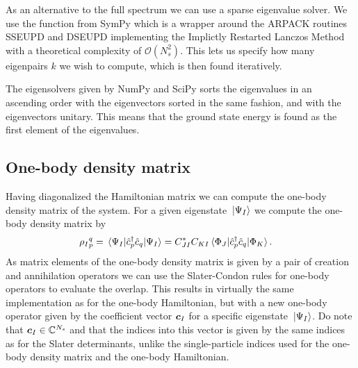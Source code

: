             As an alternative to the full spectrum we can use a sparse
            eigenvalue solver.
            We use the function  from SymPy
            \cite{sympy} which is a wrapper around the ARPACK routines SSEUPD
            and DSEUPD \cite{arpack} implementing the Implictly Restarted
            Lanczos Method with a theoretical complexity of $\mathcal{O}(N_s^2)$.
            This lets us specify how many eigenpairs $k$ we wish to compute,
            which is then found iteratively.

            The eigensolvers given by NumPy \cite{numpy} and SciPy \cite{sympy}
            sorts the eigenvalues in an ascending order with the eigenvectors
            sorted in the same fashion, and with the eigenvectors unitary.
            This means that the ground state energy is found as the first
            element of the eigenvalues.

        \subsection{One-body density matrix}
            Having diagonalized the Hamiltonian matrix we can compute the one-body
            density matrix of the system.
            For a given eigenstate $\ket*{\Psi_I}$ we compute the one-body
            density matrix by
            \begin{align}
                {\rho_I}^{q}_{p}
                &= \mel*{\Psi_I}{\hat{c}_{p}^{\dagger}\hat{c}_{q}}{\Psi_I}
                = C_{JI}^{*}C_{KI}
                \mel*{\Phi_J}{\hat{c}_{p}^{\dagger}\hat{c}_{q}}{\Phi_K}.
                \label{eq:ci-one-body-density}
            \end{align}
            As matrix elements of the one-body density matrix is given by a pair
            of creation and annihilation operators we can use the Slater-Condon
            rules for one-body operators to evaluate the overlap.
            This results in virtually the same implementation as for the
            one-body Hamiltonian, but with a new one-body operator given by the
            coefficient vector $\boldsymbol{c}_I$ for a specific eigenstate
            $\ket*{\Psi_I}$.
            Do note that $\boldsymbol{c}_I \in \mathbb{C}^{N_s}$ and that the indices
            into this vector is given by the same indices as for the Slater
            determinants, unlike the single-particle indices used for the
            one-body density matrix and the one-body Hamiltonian.

